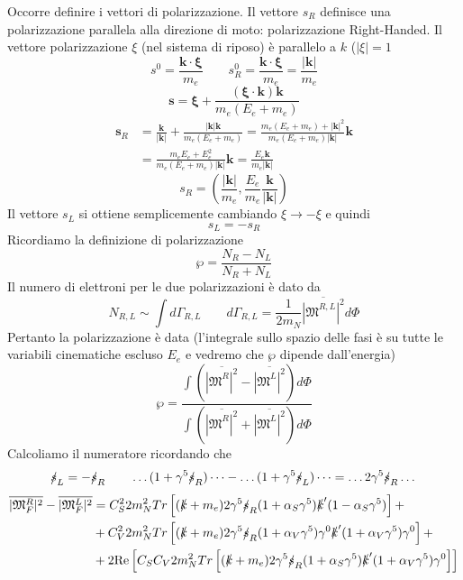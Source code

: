 Occorre definire i vettori di polarizzazione. Il vettore $s_R$ definisce una polarizzazione parallela alla direzione di moto: polarizzazione Right-Handed. Il vettore polarizzazione $\xi$ (nel sistema di riposo) è parallelo a $k$ ($|\xi|=1$
$$
s^0 = \frac{\mathbf{k} \cdot \boldsymbol{\xi}}{m_e} \qquad s_R^0 = \frac{\mathbf{k} \cdot \boldsymbol{\xi}}{m_e} = \frac{|\mathbf{k}|}{m_e}
$$
$$
 \mathbf{s} = \boldsymbol{\xi} + \frac{(\boldsymbol{\xi} \cdot \mathbf{k})\mathbf{k}}{m_e (E_e + m_e)}
$$
$$
\begin{aligned}
	\mathbf{s}_R &= \frac{\mathbf{k}}{|\mathbf{k}|} + \frac{|\mathbf{k}|\mathbf{k}}{m_e (E_e + m_e)} = \frac{m_e (E_e + m_e) + |\mathbf{k}|^2}{m_e (E_e + m_e)|\mathbf{k}|} \mathbf{k} \\
	&= \frac{m_e E_e + E_e^2}{m_e (E_e + m_e)|\mathbf{k}|} \mathbf{k} = \frac{E_e \mathbf{k}}{m_e |\mathbf{k}|}
\end{aligned}
$$
$$
s_R = \left( \frac{|\mathbf{k}|}{m_e}, \frac{E_e}{m_e} \frac{\mathbf{k}}{|\mathbf{k}|} \right)
$$
Il vettore $s_L$ si ottiene semplicemente cambiando $\xi\to-\xi$ e quindi
$$
s_L=-s_R
$$
Ricordiamo la definizione di polarizzazione
$$
\wp = \frac{N_R - N_L}{N_R + N_L}
$$
Il numero di elettroni per le due polarizzazioni è dato da
$$
N_{R,L} \sim \int d\Gamma_{R,L} \qquad d\Gamma_{R,L} = \frac{1}{2m_N} \overline{|\mathfrak{M}^{R,L}|^2} d\Phi
$$
Pertanto la polarizzazione è data (l'integrale sullo spazio delle fasi è su tutte le variabili cinematiche escluso $E_e$ e vedremo che $\wp$ dipende dall'energia)
$$
\wp = \frac{\int \left( \overline{|\mathfrak{M}^R|^2} - \overline{|\mathfrak{M}^L|^2} \right) d\Phi}{\int \left( \overline{|\mathfrak{M}^R|^2} + \overline{|\mathfrak{M}^L|^2} \right) d\Phi}
$$
Calcoliamo il numeratore ricordando che
$$
\slashed{s}_L = -\slashed{s}_R \qquad \dots(1 + \gamma^5 \slashed{s}_R)\dots - \dots(1 + \gamma^5 \slashed{s}_L)\dots = \dots 2\gamma^5 \slashed{s}_R \dots
$$
$$
\begin{aligned}
	\overline{|\mathfrak{M}_F^R|^2} - \overline{|\mathfrak{M}_F^L|^2} &= C_S^2 2m_N^2 Tr \left[ (\slashed{k} + m_e) 2\gamma^5 \slashed{s}_R (1 + \alpha_S \gamma^5) \slashed{k}' (1 - \alpha_S \gamma^5) \right] + \\
	&+ C_V^2 2m_N^2 Tr \left[ (\slashed{k} + m_e) 2\gamma^5 \slashed{s}_R (1 + \alpha_V \gamma^5) \gamma^0 \slashed{k}' (1 + \alpha_V \gamma^5) \gamma^0 \right] + \\
	&+ 2 \text{Re} \left[ C_S C_V 2m_N^2 Tr \left[ (\slashed{k} + m_e) 2\gamma^5 \slashed{s}_R (1 + \alpha_S \gamma^5) \slashed{k}' (1 + \alpha_V \gamma^5) \gamma^0 \right] \right]
\end{aligned}
$$
